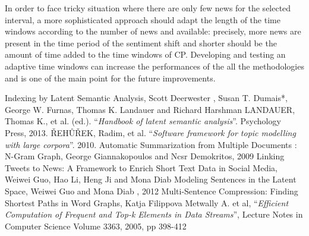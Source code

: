 \documentclass{acm_proc_article-sp-sigmod07}
\begin{document}
In order to face tricky situation where there are only few news for the selected interval, a more sophisticated approach should adapt the length of the time windows according to the number of news and available:
precisely, more news are present in the time period of the sentiment shift and shorter should be the amount of time added to the time windows of CP.
Developing and testing an adaptive time windows can increase the performances of the all the methodologies and is one of the main point for the future improvements.

\begin{thebibliography}{9}
	Indexing by Latent Semantic Analysis, Scott Deerwester , Susan T. Dumais*, George W. Furnas,  Thomas K. Landauer  and Richard Harshman 
  LANDAUER, Thomas K., et al. (ed.). ``\emph{Handbook of latent semantic analysis}''. Psychology Press, 2013.
  ŘEHŮŘEK, Radim, et al. ``\emph{Software framework for topic modelling with large corpora}''. 2010.
	Automatic Summarization from Multiple Documents : N-Gram Graph, George Giannakopoulos and Ncsr Demokritos, 2009
	Linking Tweets to News: A Framework to Enrich Short Text Data in Social Media, Weiwei Guo, Hao Li, Heng Ji and Mona Diab
	Modeling Sentences in the Latent Space, Weiwei Guo and Mona Diab , 2012
	Multi-Sentence Compression: Finding Shortest Paths in Word Graphs, Katja Filippova 
	Metwally A. et al, ``\emph{Efficient Computation of Frequent and Top-k
	Elements in Data Streams}'', Lecture Notes in Computer Science Volume 3363, 2005, pp 398-412

\end{thebibliography}
\end{document}
